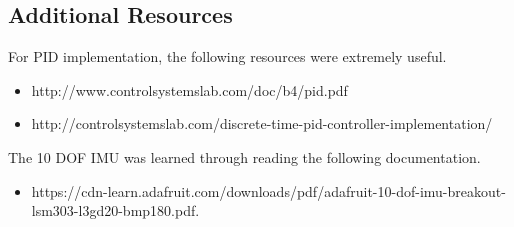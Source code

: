 \begin{itemize}
\subsection{Additional Resources}

For PID implementation, the following resources were extremely useful.
\begin{itemize}
\item http://www.controlsystemslab.com/doc/b4/pid.pdf
\item http://controlsystemslab.com/discrete-time-pid-controller-implementation/ 
\end{itemize}

 The 10 DOF IMU was learned through reading the following documentation.
 
\begin{itemize}
\item https://cdn-learn.adafruit.com/downloads/pdf/adafruit-10-dof-imu-breakout-lsm303-l3gd20-bmp180.pdf. 
\end{itemize}

\end{itemize}
